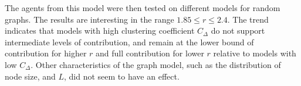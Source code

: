 The agents from this model were then tested on different models for random graphs. The results are interesting in the range $1.85\leq r \leq 2.4$. The trend indicates that models with high clustering coefficient $C_\Delta$ do not support intermediate levels of contribution, and remain at the lower bound of contribution for higher $r$ and full contribution for lower $r$ relative to models with low $C_\Delta$. Other characteristics of the graph model, such as the distribution of node size, and $L$, did not seem to have an effect. \\



